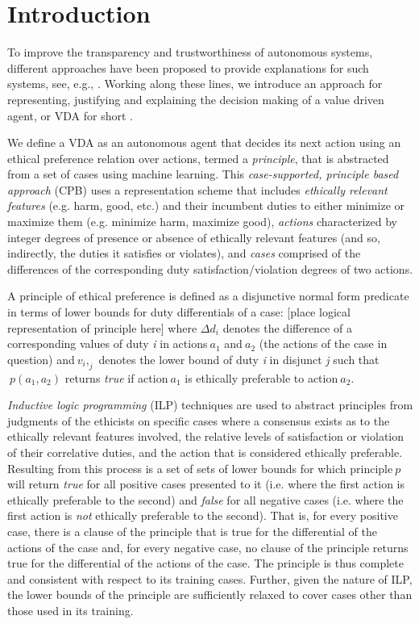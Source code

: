 \documentclass[letterpaper]{article} %
\begin{document}
\section{Introduction}
To improve the transparency and trustworthiness of autonomous systems, different approaches have been proposed to provide explanations for such systems, see, e.g., \cite{Cocarascu2018,DBLP:conf/ijcai/ShihCD18,DBLP:journals/corr/abs-1806-08055}. Working along these lines, we introduce an approach for representing, justifying and explaining the decision making of a value driven agent, or VDA for short \cite{DBLP:conf/aaai/AndersonAB17}.  

We define a VDA as an autonomous agent that decides its next action using an ethical preference relation over actions, termed a \textit{principle}, that is abstracted from a set of cases using machine learning. This \textit{case-supported, principle based approach} (CPB) uses a representation scheme that includes \textit{ethically relevant features} (e.g. harm, good, etc.) and their incumbent duties to either minimize or maximize them (e.g. minimize harm, maximize good), \textit{actions} characterized by integer degrees of presence or absence of ethically relevant features (and so, indirectly, the duties it satisfies or violates), and \textit{cases} comprised of the differences of the corresponding duty satisfaction/violation degrees of two actions.  	

A principle of ethical preference is defined as a disjunctive normal form predicate in terms of lower bounds for duty differentials of a case: 
[place logical representation of principle here]
where $\Delta d_i$ denotes the difference of a corresponding values of duty \textit{i} in actions$\ a_1$ and$\ a_2$ (the actions of the case in question) and$\ v_i,_j$ denotes the lower bound of duty \textit{i} in disjunct \textit{j} such that$\ p(a_1,a_2)$ returns \textit{true} if action$\ a_1$  is ethically preferable to action$\ a_2$.  

\textit{Inductive logic programming} (ILP) techniques are used to abstract principles from judgments of the ethicists on specific cases where a consensus exists as to the ethically relevant features involved, the relative levels of satisfaction or violation of their correlative duties, and the action that is considered ethically preferable.  Resulting from this process is a set of sets of lower bounds for which principle$\ p$ will return \textit{true} for all positive cases presented to it (i.e. where the first action is ethically preferable to the second) and \textit{false} for all negative cases (i.e. where the first action is \textit{not} ethically preferable to the second). That is, for every positive case, there is a clause of the principle that is true for the differential of the actions of the case and, for every negative case, no clause of the principle returns true for the differential of the actions of the case.  The principle is thus complete and consistent with respect to its training cases.  Further, given the nature of ILP, the lower bounds of the principle are sufficiently relaxed to cover cases other than those used in its training.
\end{document}
